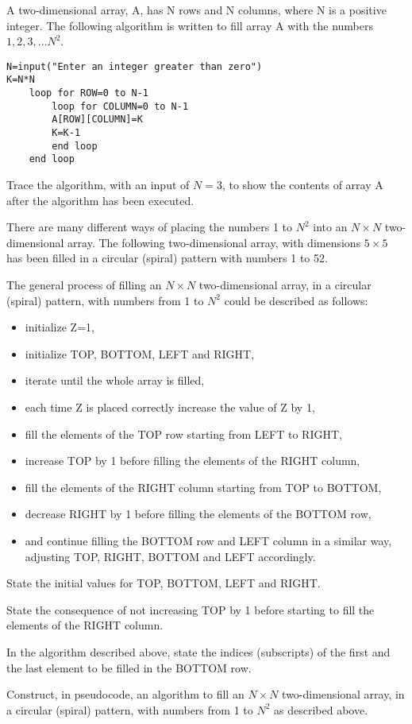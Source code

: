 \begin{exercise*}%
A two-dimensional array, A, has N rows and N columns, where N is a positive integer.
The following algorithm is written to fill array A with the numbers $1, 2, 3,\ldots N^2$.
\begin{verbatim}
N=input("Enter an integer greater than zero")
K=N*N
	loop for ROW=0 to N-1
		loop for COLUMN=0 to N-1
		A[ROW][COLUMN]=K
		K=K-1
		end loop
	end loop
\end{verbatim}
\begin{parts}
\item Trace the algorithm, with an input of $N=3$, to show the contents of array A after the algorithm has been executed.
\end{parts}
There are many different ways of placing the numbers 1 to $N^2$ into an $N \times N$ two-dimensional array. 
The following two-dimensional array, with dimensions $5 \times 5$ has been filled in a circular (spiral) pattern with numbers 1 to 52.

The general process of filling an $N \times N$ two-dimensional array, in a circular (spiral) pattern, with numbers from 1 to $N^2$ could be described as follows:

\begin{itemize}
\item initialize Z=1,
\item initialize TOP, BOTTOM, LEFT and RIGHT,
\item iterate until the whole array is filled,
\item each time Z is placed correctly increase the value of Z by 1,
\item fill the elements of the TOP row starting from LEFT to RIGHT,
\item increase TOP by 1 before filling the elements of the RIGHT column,
\item fill the elements of the RIGHT column starting from TOP to BOTTOM,
\item decrease RIGHT by 1 before filling the elements of the BOTTOM row,
\item and continue filling the BOTTOM row and LEFT column in a similar way, adjusting TOP, RIGHT, BOTTOM and LEFT accordingly.
\end{itemize}

\begin{parts}
\item State the initial values for TOP, BOTTOM, LEFT and RIGHT.
\item State the consequence of not increasing TOP by 1 before starting to fill the elements of the RIGHT column.
\item In the algorithm described above, state the indices (subscripts) of the first and the last element to be filled in the BOTTOM row.
\item Construct, in pseudocode, an algorithm to fill an $N \times N$ two-dimensional array, in a circular (spiral) pattern, with numbers from 1 to $N^2$ as described above.
\end{parts}
\end{exercise*}
